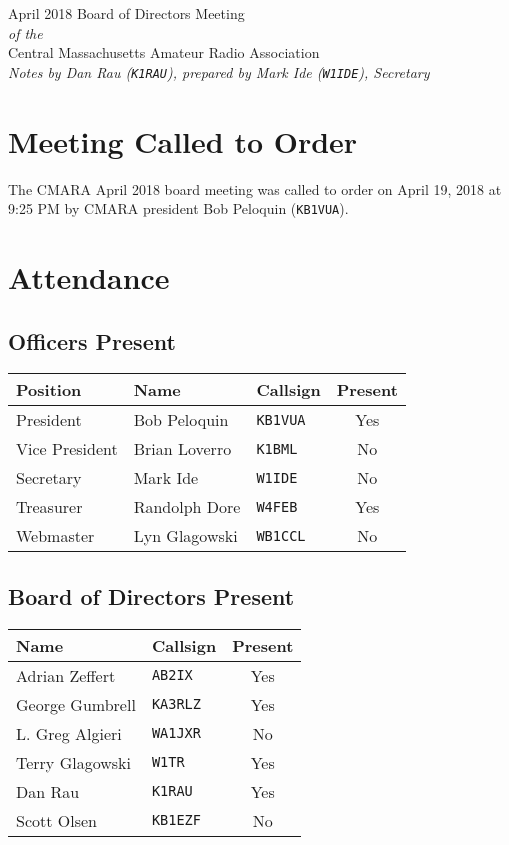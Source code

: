 \documentclass[10pt,letterpaper]{article}
\begin{document}
\begin{center}
{\huge April 2018 Board of Directors Meeting}\\
\emph{of the}\\
{\Large Central Massachusetts Amateur Radio Association}\\
\emph{Notes by Dan Rau (\texttt{K1RAU}), prepared by Mark Ide (\texttt{W1IDE}), Secretary}
\end{center}

\section{Meeting Called to Order}
The CMARA April 2018 board meeting was called to order on April 19, 2018 at 9:25 PM by CMARA president Bob Peloquin (\texttt{KB1VUA}).

\section{Attendance}

\subsection{Officers Present}
\begin{tabular}{|l|l|l|c|}
  \hline
  \textbf{Position} & \textbf{Name}  & \textbf{Callsign} & \textbf{Present} \\ \hline
  President         & Bob Peloquin   & \texttt{KB1VUA}   & Yes \\
  Vice President    & Brian Loverro  & \texttt{K1BML}    & No  \\
  Secretary         & Mark Ide       & \texttt{W1IDE}    & No  \\
  Treasurer         & Randolph Dore  & \texttt{W4FEB}    & Yes \\
  Webmaster         & Lyn Glagowski  & \texttt{WB1CCL}   & No  \\
  \hline
\end{tabular}

\subsection{Board of Directors Present}
\begin{tabular}{|l|l|c|}
  \hline
  \textbf{Name}   & \textbf{Callsign} & \textbf{Present} \\ \hline
  Adrian Zeffert  & \texttt{AB2IX}    &  Yes \\ \hline
  George Gumbrell & \texttt{KA3RLZ}   &  Yes \\ \hline
  L. Greg Algieri & \texttt{WA1JXR}   &  No  \\ \hline
  Terry Glagowski & \texttt{W1TR}     &  Yes \\ \hline
  Dan Rau         & \texttt{K1RAU}    &  Yes \\ \hline
  Scott Olsen     & \texttt{KB1EZF}   &  No  \\ \hline
\end{tabular}\\
\end{document}
